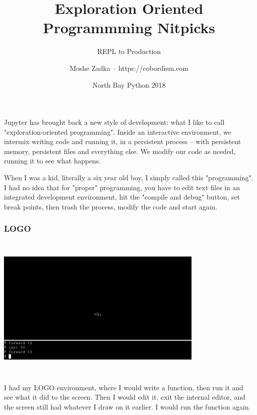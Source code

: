 \usepackage[utf8]{inputenc}
\usepackage{listings}
\usepackage{textcomp}
\usepackage{fancyvrb}

\title{Exploration Oriented Programmming Nitpicks}
\subtitle{REPL to Production}
\author{Moshe Zadka -- https://cobordism.com}
\date{North Bay Python 2018}
 

 
\begin{titlepage}
\maketitle
\end{titlepage}

\frame{\titlepage}

Jupyter has brought back a new style of development:
what I like to call
"exploration-oriented programming".
Inside an interactive environment,
we intermix writing code
and running it,
in a persistent process --
with persistent memory,
persistent files and
everything else.
We modify our code as needed,
running it to
see what happens.

When I was a kid,
literally a six year old boy,
I simply called this
"programming".
I had no idea that for "proper"
programming,
you have to edit text files in an integrated development environment,
hit the "compile and debug" button,
set break points,
then trash the process,
modify the code and start again.

\begin{frame}[fragile]
\frametitle{LOGO}

\includegraphics[height=7cm,width=10cm]{logo.png}

\end{frame}


I had my LOGO environment,
where I would write a function,
then run it and see what it did to the screen.
Then I would edit it,
exit the internal editor,
and the screen still had whatever I draw on it earlier.
I would run the function again.


